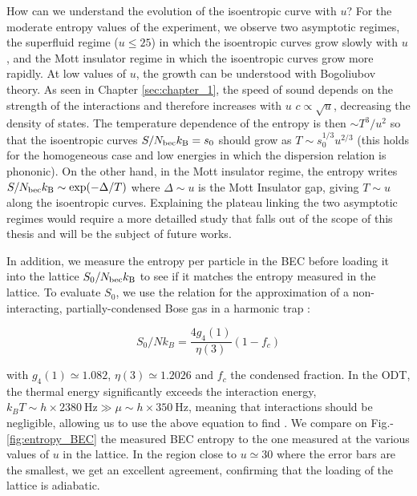 How can we understand the evolution of the isoentropic curve with $u$? For the moderate entropy values of the experiment, we observe two asymptotic regimes, the superfluid regime ($u \leq 25$) in which the isoentropic curves grow slowly with $u$, and the Mott insulator regime in which the isoentropic curves grow more rapidly. At low values of $u$, the growth can be understood with Bogoliubov theory. As seen in Chapter \ref{sec:chapter_1}, the speed of sound depends on the strength of the interactions and therefore increases with $u$ $c \propto \sqrt{u}$, decreasing the density of states. The temperature dependence of the entropy is then $\sim T^3/u^2$ so that the isoentropic curves $S/N_{\rm{bec}} k_{\mathrm{B}} =s_0$ should grow as $T \sim s_{0}^{1 / 3} u^{2 / 3}$ (this holds for the homogeneous case and low energies in which the dispersion relation is phononic). On the other hand, in the Mott insulator regime, the entropy writes $S/N_{\rm{bec}} k_{\mathrm{B}} \sim \exp(-\Delta/T)$ where $\Delta \sim u$ is the Mott Insulator gap, giving $T \sim u$ along the isoentropic curves. Explaining the plateau linking the two asymptotic regimes would require a more detailled study that falls out of the scope of this thesis and will be the subject of future works.


In addition, we measure the entropy per particle in the BEC before loading it into the lattice $S_0/N_{\rm{bec}} k_{\mathrm{B}}$ to see if it matches the entropy measured in the lattice. To evaluate $S_0$, we use the relation for the approximation of a non-interacting, partially-condensed Bose gas in a harmonic trap \cite{pitaevskii2016bose}:

\begin{equation}
    S_{0} / N k_{B}=\frac{4 g_{4}(1)}{\eta(3)}\left(1-f_{c}\right)
\end{equation}

\noindent with $g_{4}(1) \simeq 1.082$, $\eta(3) \simeq 1.2026$ and $f_c$ the condensed fraction. In the ODT, the thermal energy significantly exceeds the interaction energy, $k_{B} T \sim h \times 2380 \mathrm{~Hz} \gg \mu \sim h \times 350 \mathrm{~Hz}$, meaning that interactions should be negligible, allowing us to use the above equation to find . We compare on Fig.-\ref{fig:entropy_BEC} the measured BEC entropy to the one measured at the various values of $u$ in the lattice. In the region close to $u \simeq 30$ where the error bars are the smallest, we get an excellent agreement, confirming that the loading of the lattice is adiabatic.

